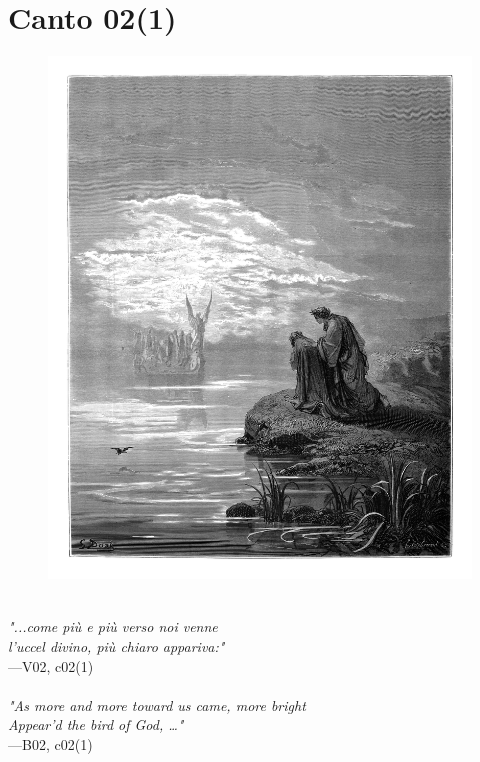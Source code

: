 \documentclass[../Dore_vision.tex]{subfiles}
\begin{document}
\newpage

\section{Canto 02(1)}

\begin{figure}[ht]
\centering
\includegraphics[height=\figsize]{illustrations/book_2/V02, c02(1).jpg}
\end{figure}

\begin{center}
\begin{minipage}{0.8\linewidth}
\textit{\\
"...come più e più verso noi venne\\l’uccel divino, più chiaro appariva:"} \\
—V02, c02(1) \\~\\
\textit{"As more and more toward us came, more bright\\Appear'd the bird of God, …"} \\
—B02, c02(1)
\end{minipage}
\end{center}
\end{document}
